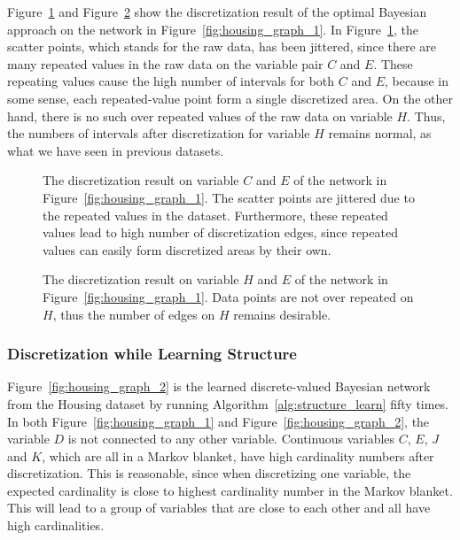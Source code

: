 Figure~\ref{fig:housing_exp1_distr_3_5} and Figure~\ref{fig:housing_exp1_distr_8_5} show the discretization result of the optimal Bayesian approach on the network in Figure~\ref{fig:housing_graph_1}.
In Figure~\ref{fig:housing_exp1_distr_3_5}, the scatter points, which stands for the raw data, has been jittered, since there are many repeated values in the raw data on the variable pair $C$ and $E$. These repeating values cause the high number of intervals for both $C$ and $E$, because in some sense, each repeated-value point form a single discretized area. On the other hand, there is no such over repeated values of the raw data on variable $H$. Thus, the numbers of intervals after discretization for variable $H$ remains normal, as what we have seen in previous datasets.

\begin{figure}[ht]
\centering
      
  \caption{The discretization result on variable $C$ and $E$ of the network in Figure~\ref{fig:housing_graph_1}. The scatter points are jittered due to the repeated values in the dataset. Furthermore, these repeated values lead to high number of discretization edges, since repeated values can easily form discretized areas by their own.}
  \label{fig:housing_exp1_distr_3_5}
\end{figure}

\begin{figure}[ht]
\centering
    
  \caption{The discretization result on variable $H$ and $E$ of the network in Figure~\ref{fig:housing_graph_1}. Data points are not over repeated on $H$, thus the number of edges on $H$ remains desirable.}
  \label{fig:housing_exp1_distr_8_5}
\end{figure}

\subsubsection{Discretization while Learning Structure}
\label{subsubsec:housing_exp2}

Figure~\ref{fig:housing_graph_2} is the learned discrete-valued Bayesian network from the Housing dataset by running Algorithm~\ref{alg:structure_learn} fifty times.
In both Figure~\ref{fig:housing_graph_1} and Figure~\ref{fig:housing_graph_2}, the variable $D$ is not connected to any other variable.
Continuous variables $C$, $E$, $J$ and $K$, which are all in a Markov blanket, have high cardinality numbers after discretization.
This is reasonable, since when discretizing one variable, the expected cardinality is close to highest cardinality number in the Markov blanket.
This will lead to a group of variables that are close to each other and all have high cardinalities.

